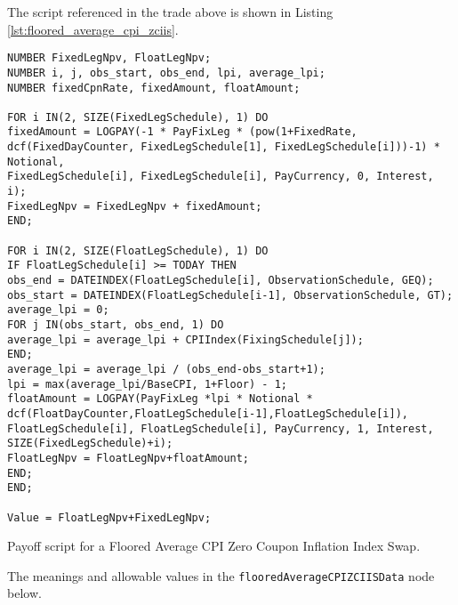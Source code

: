 The script referenced in the trade above is shown in Listing \ref{lst:floored_average_cpi_zciis}.
 
\begin{listing}[hbt] 
\begin{verbatim} 
NUMBER FixedLegNpv, FloatLegNpv;
NUMBER i, j, obs_start, obs_end, lpi, average_lpi;
NUMBER fixedCpnRate, fixedAmount, floatAmount;

FOR i IN(2, SIZE(FixedLegSchedule), 1) DO
fixedAmount = LOGPAY(-1 * PayFixLeg * (pow(1+FixedRate, dcf(FixedDayCounter, FixedLegSchedule[1], FixedLegSchedule[i]))-1) * Notional,
FixedLegSchedule[i], FixedLegSchedule[i], PayCurrency, 0, Interest, i);
FixedLegNpv = FixedLegNpv + fixedAmount;
END;

FOR i IN(2, SIZE(FloatLegSchedule), 1) DO
IF FloatLegSchedule[i] >= TODAY THEN
obs_end = DATEINDEX(FloatLegSchedule[i], ObservationSchedule, GEQ);
obs_start = DATEINDEX(FloatLegSchedule[i-1], ObservationSchedule, GT);
average_lpi = 0;
FOR j IN(obs_start, obs_end, 1) DO
average_lpi = average_lpi + CPIIndex(FixingSchedule[j]);
END;
average_lpi = average_lpi / (obs_end-obs_start+1);
lpi = max(average_lpi/BaseCPI, 1+Floor) - 1;
floatAmount = LOGPAY(PayFixLeg *lpi * Notional * dcf(FloatDayCounter,FloatLegSchedule[i-1],FloatLegSchedule[i]),
FloatLegSchedule[i], FloatLegSchedule[i], PayCurrency, 1, Interest, SIZE(FixedLegSchedule)+i);
FloatLegNpv = FloatLegNpv+floatAmount;
END;
END;

Value = FloatLegNpv+FixedLegNpv;
\end{verbatim} 
\caption{Payoff script for a Floored Average CPI Zero Coupon Inflation Index Swap.} 
\label{lst:floored_average_cpi_zciis} 
\end{listing} 
 
The meanings and allowable values in the \lstinline!flooredAverageCPIZCIISData! node below.
 
